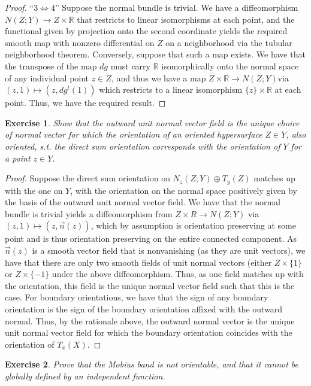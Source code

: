 \documentclass{article}
\newtheorem{exercise}{Exercise}
\begin{document}
\begin{proof}
``$3 \iff 4$'' Suppose the normal bundle is trivial. We have a diffeomorphism $N(Z; Y) \to Z \times \mathbb{R}$ that restricts to linear isomorphisms at each point, and the functional given by projection onto the second coordinate yields the required smooth map with nonzero differential on $Z$ on a neighborhood via the tubular neighborhood theorem. Conversely, suppose that such a map exists. We have that the transpose of the map $dg$ must carry $\mathbb{R}$ isomorphically onto the normal space of any individual point $z \in Z$, and thus we have a map $Z \times \mathbb{R} \to N(Z;Y)$via $(z, 1) \mapsto (z, dg^{t}(1))$ which restricts to a linear isomorphism $\{z\} \times \mathbb{R}$ at each point. Thus, we have the required result.  
\end{proof}


\begin{exercise}
Show that the outward unit normal vector field is the unique choice of normal vector for which the orientation of an oriented hypersurface $Z \in Y$, also oriented, s.t. the direct sum orientation corresponds with the orientation of $Y$ for a point $z \in Y$.   
\end{exercise}

\begin{proof}
  Suppose the direct sum orientation on $N_{z}(Z; Y) \oplus T_{y}(Z)$ matches up with the one on $Y$, with the orientation on the normal space positively given by the basis of the outward unit normal vector field. We have that the normal bundle is trivial yields a diffeomorphism from $Z \times R \to N(Z;Y)$ via $(z,1) \mapsto (z, \vec{n}(z))$, which by assumption is orientation preserving at some point and is thus orientation preserving on the entire connected component. As $\vec{n}(z)$ is a smooth vector field that is nonvanishing (as they are unit vectors), we have that there are only two smooth fields of unit normal vectors (either $Z \times \{1\}$ or $Z \times \{-1\}$ under the above diffeomorphism. Thus, as one field matches up with the orientation, this field is the unique normal vector field such that this is the case. For boundary orientations, we have that the sign of any boundary orientation is the sign of the boundary orientation affixed with the outward normal. Thus, by the rationale above, the outward normal vector is the unique unit normal vector field for which the boundary orientation coincides with the orientation of $T_{x}(X)$. 
\end{proof}

\begin{exercise}
Prove that the Mobius band is not orientable, and that it cannot be globally defined by an independent function.   
\end{exercise}
\end{document}
